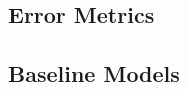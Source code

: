 \documentclass{article}
\begin{document}

\subsection{Error Metrics}

\subsection{Baseline Models}
\end{document}
